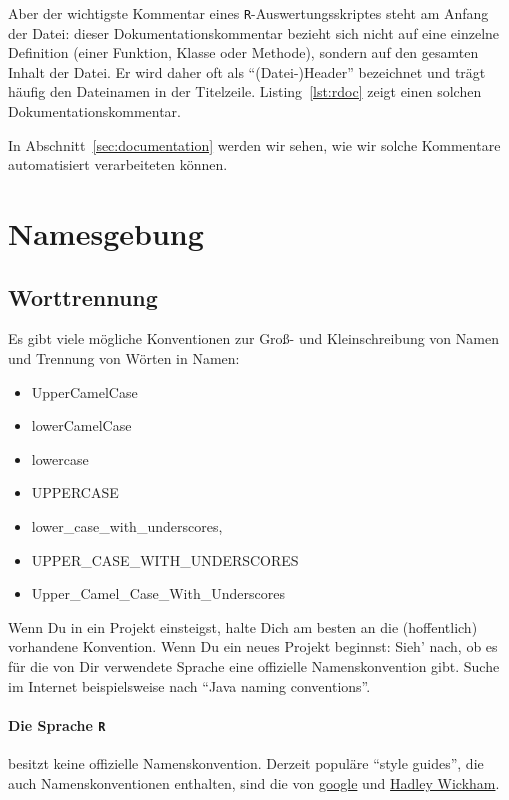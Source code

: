 \documentclass[twoside]{scrreprt}
\providecommand{\R}{\texttt{R}}
\begin{document}
Aber der wichtigste Kommentar eines \R{}-Auswertungsskriptes steht 
am Anfang der Datei: dieser Dokumentationskommentar bezieht sich nicht auf eine
einzelne Definition (einer Funktion, Klasse oder Methode), sondern auf den
gesamten Inhalt der
Datei. Er wird daher oft als "`(Datei-)Header"' bezeichnet und tr\"a{}gt
h\"a{}ufig den Dateinamen in der Titelzeile.
Listing~\ref{lst:rdoc} zeigt einen solchen Dokumentationskommentar.


In Abschnitt~\ref{sec:documentation} werden wir sehen, wie wir solche
Kommentare automatisiert verarbeiteten k\"o{}nnen.


\section{Namesgebung\label{sec:naming}}
\subsection{Worttrennung}
Es gibt viele m\"o{}gliche Konventionen zur Gro\ss{}- und Kleinschreibung  von
Namen und
Trennung von W\"o{}rten in Namen:
\begin{itemize}
\item UpperCamelCase
\item lowerCamelCase
\item lowercase
\item UPPERCASE
\item lower\_case\_with\_underscores,
\item UPPER\_CASE\_WITH\_UNDERSCORES
\item Upper\_Camel\_Case\_With\_Underscores
\end{itemize}
Wenn Du in ein Projekt einsteigst, halte Dich am besten an die (hoffentlich)
vorhandene Konvention.
Wenn Du ein neues Projekt beginnst: Sieh' nach, ob es f\"u{}r die von Dir
verwendete Sprache eine offizielle Namenskonvention gibt. Suche im Internet
beispielsweise nach "`Java naming conventions"'.

\paragraph{Die Sprache \R{}} besitzt keine offizielle
Namenskonvention. Derzeit
popul\"a{}re "`style guides"', die auch Namenskonventionen enthalten, sind die
von
\href{https://google-styleguide.googlecode.com/svn/trunk/Rguide.xml}{google} und
\href{http://adv-r.had.co.nz/Style.html}{Hadley Wickham}.
\end{document}
